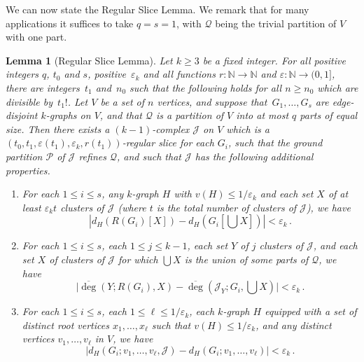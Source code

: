 \documentclass[12pt,a4paper]{amsart}
\def\itm#1{\rm ({#1})}
\def\itmit#1{\itm{\it #1\,}}
\def\abc{\itmit{\alph{*}}}
\let\eps\varepsilon
\newtheorem{lemma}[theorem] {Lemma}
\newcommand{\NATS}{\mathbb{N}}
\newcommand{\cJ}{\mathcal{J}}
\newcommand{\Part}{\mathcal{P}}
\newcommand{\Qart}{\mathcal{Q}}
\newcommand{\reldeg}{\overline{\deg}}
\begin{document}
We can now state the Regular Slice Lemma. We remark that for many
applications it suffices to take $q = s =1$, with $\Qart$ being the
trivial partition of $V$ with one part.

\begin{lemma}[Regular Slice Lemma]\label{lem:simpreg}
Let $k \geq 3$ be a fixed integer. For all positive integers $q$, $t_0$ and $s$,
positive~$\eps_k$ and all functions $r: \NATS \rightarrow \NATS$ 
and $\eps: \NATS \rightarrow (0,1]$, there are integers~$t_1$ 
and~$n_0$ such that the following holds for all $n \ge n_0$ which are divisible 
by~$t_1!$. Let $V$ be a set of $n$ vertices, and suppose that~$G_1, \dots,
G_s$ are edge-disjoint $k$-graphs on $V$, and that $\Qart$ is a partition of $V$
into at most $q$ parts of equal size. Then there exists a $(k-1)$-complex
$\cJ$ on $V$ which is a
$(t_0,t_1,\eps(t_1),\eps_k,r(t_1))$-regular slice for each
$G_i$, such that the ground partition $\Part$ of $\cJ$ refines $\Qart$, and such
that $\cJ$ has the following additional properties.
\begin{enumerate}[label=\abc]
  \item\label{simpreg:a} For each $1 \leq i \leq s$, any $k$-graph $H$ with $v(H)\le 1/\eps_k$ and each
  set $X$ of at least $\eps_k t$ clusters of $\cJ$ (where $t$ is the total number of clusters of $\cJ$), we have
  \[\left|d_H\left(R(G_i)[X]\right)-d_H\left(G_i\left[\bigcup X\right]\right)\right|<\eps_k\,.\]
  \item\label{simpreg:b} For each $1 \leq i \leq s$, each $1 \le j \le k-1$,
  each set $Y$ of $j$ clusters of $\cJ$, and each set $X$ of clusters of $\cJ$
  for which $\bigcup X$ is the union of some parts of $\Qart$, we have
  \[\big|\reldeg(Y;R(G_i), X)-\reldeg(\cJ_Y;G_i, \bigcup X)\big|<\eps_k\,.\]
  \item\label{simpreg:c} For each $1\leq i\leq s$, each $1\le\ell\le 1/\eps_k$,
  each $k$-graph $H$ equipped with a set of distinct root vertices
  $x_1,\ldots,x_\ell$ such that $v(H)\le 1/\eps_k$, and any distinct vertices
  $v_1,\ldots,v_\ell$ in $V$, we have
  \[\big|d_H(G_i;v_1,\ldots,v_\ell,\cJ)-d_H(G_i;v_1,\ldots,v_\ell) \big|<\eps_k
  \,.\]
\end{enumerate}
\end{lemma}
\end{document}
